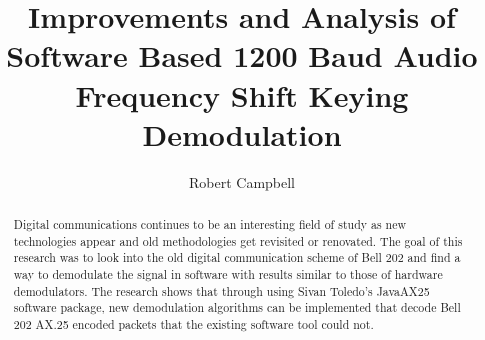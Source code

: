\documentclass[12pt]{ucthesis}
\begin{document}
\title{Improvements and Analysis of Software Based 1200 Baud Audio Frequency Shift Keying Demodulation}
\author{Robert Campbell}
  
 
     
\maketitle

\begin{frontmatter}

\copyrightpage

\committeemembershippage

\begin{abstract}
Digital communications continues to be an interesting field of study as new technologies appear and old methodologies get revisited or renovated. The goal of this research was to look into the old digital communication scheme of Bell 202 and find a way to demodulate the signal in software with results similar to those of hardware demodulators. The research shows that through using Sivan Toledo’s JavaAX25 software package, new demodulation algorithms can be implemented that decode Bell 202 AX.25 encoded packets that the existing software tool could not.
\end{abstract}


\tableofcontents

\end{frontmatter}





\end{document}
